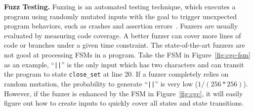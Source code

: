 \noindent\textbf{Fuzz Testing.}
Fuzzing is an automated testing technique,
which executes a program
using randomly mutated inputs
with the goal to trigger unexpected program behaviors,
such as crashes and assertion errors~\cite{afl,Angora,youwei-1}.
Fuzzers are usually evaluated by measuring code coverage.
A better fuzzer can cover more lines of code
or branches under a given time constraint.
The state-of-the-art fuzzers are not good at processing
FSMs in a program.
Take the FSM in Figure~\ref{fig:cgc-fsm} as an example,
``\verb/||/'' is the only input which has two characters and
can transit the program to state \texttt{close\_set} at line 20.
If a fuzzer completely relies on random mutation, the probability to
generate ``\verb/||/'' is very low ($1/(256 * 256)$).
However, if the fuzzer is enhanced by the
FSM in Figure~\ref{fig:cgc},
it will easily figure out how to create inputs to quickly cover
all states and state transitions.







